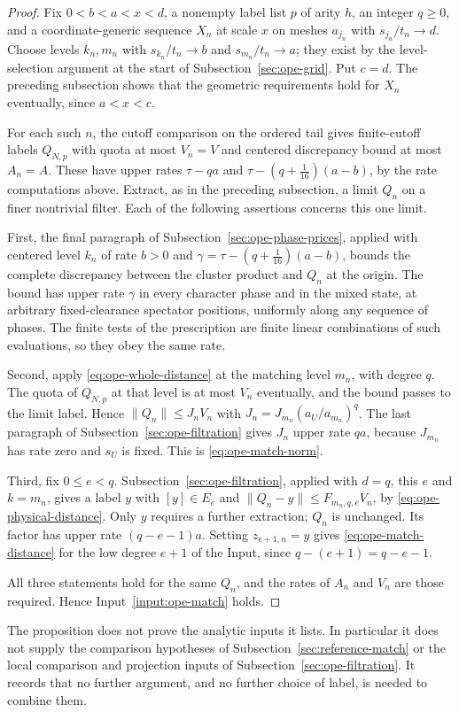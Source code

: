 \begin{proof}
Fix $0<b<a<x<d$, a nonempty label list $p$ of arity $h$, an integer
$q\ge0$, and a coordinate-generic sequence $X_n$ at scale $x$ on meshes
$a_{j_n}$ with $s_{j_n}/t_n\to d$. Choose levels $k_n,m_n$ with
$s_{k_n}/t_n\to b$ and $s_{m_n}/t_n\to a$; they exist by the
level-selection argument at the start of Subsection~\ref{sec:ope-grid}.
Put $c=d$. The preceding subsection shows that the geometric
requirements hold for $X_n$ eventually, since $a<x<c$.

For each such $n$, the cutoff comparison on the ordered tail gives
finite-cutoff labels $Q_{N,p}$ with quota at most $V_n=V$ and centered
discrepancy bound at most $A_n=A$. These have upper rates $\tau-qa$
and $\tau-(q+\tfrac1{16})(a-b)$, by the rate computations above.
Extract, as in the preceding subsection, a limit $Q_n$ on a finer
nontrivial filter. Each of the following assertions concerns this one
limit.

First, the final paragraph of Subsection~\ref{sec:ope-phase-prices},
applied with centered level $k_n$ of rate $b>0$ and
$\gamma=\tau-(q+\tfrac1{16})(a-b)$, bounds the complete discrepancy
between the cluster product and $Q_n$ at the origin. The bound has
upper rate $\gamma$ in every character phase and in the mixed state,
at arbitrary fixed-clearance spectator positions, uniformly along any
sequence of phases. The finite tests of the prescription are finite
linear combinations of such evaluations, so they obey the same rate.

Second, apply \eqref{eq:ope-whole-distance} at the matching level
$m_n$, with degree $q$. The quota of $Q_{N,p}$ at that level is at most
$V_n$ eventually, and the bound passes to the limit label. Hence
$\|Q_n\|\le J_nV_n$ with $J_n=J_{m_n}(a_U/a_{m_n})^q$. The last
paragraph of Subsection~\ref{sec:ope-filtration} gives $J_n$ upper rate
$qa$, because $J_{m_n}$ has rate zero and $s_U$ is fixed. This is
\eqref{eq:ope-match-norm}.

Third, fix $0\le e<q$. Subsection~\ref{sec:ope-filtration}, applied with
$d=q$, this $e$ and $k=m_n$, gives a label $y$ with $[y]\in E_e$ and
$\|Q_n-y\|\le F_{m_n,q,e}V_n$, by \eqref{eq:ope-physical-distance}.
Only $y$ requires a further extraction; $Q_n$ is unchanged. Its factor
has upper rate $(q-e-1)a$. Setting $z_{e+1,n}=y$ gives
\eqref{eq:ope-match-distance} for the low degree $e+1$ of the Input,
since $q-(e+1)=q-e-1$.

All three statements hold for the same $Q_n$, and the rates of $A_n$
and $V_n$ are those required. Hence Input~\ref{input:ope-match} holds.
\end{proof}

The proposition does not prove the analytic inputs it lists. In
particular it does not supply the comparison hypotheses of
Subsection~\ref{sec:reference-match} or the local comparison and
projection inputs of Subsection~\ref{sec:ope-filtration}. It records that
no further argument, and no further choice of label, is needed to
combine them.
